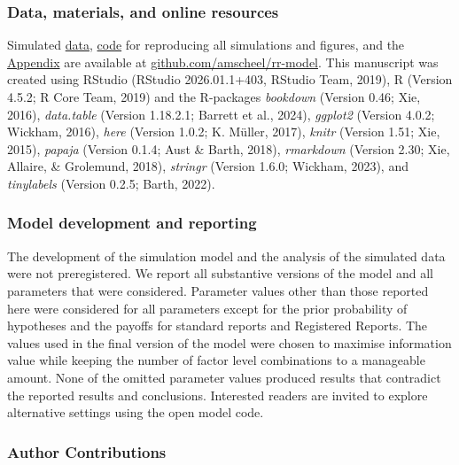 \documentclass[
  british,
  a4paper,
  ,man,floatsintext]{apa6}
\begin{document}
\subsubsection{Data, materials, and online resources}\label{data-materials-and-online-resources}

Simulated \href{https://github.com/amscheel/rr-model/tree/master/data}{data}, \href{https://github.com/amscheel/rr-model/tree/master/code}{code} for reproducing all simulations and figures, and the \href{https://github.com/amscheel/rr-model/blob/master/appendix/rr-risk-sensitivity_appendix.pdf}{Appendix} are available at \href{https://github.com/amscheel/rr-model}{github.com/amscheel/rr-model}.
This manuscript was created using RStudio (RStudio 2026.01.1+403, RStudio Team, 2019), R (Version 4.5.2; R Core Team, 2019) and the R-packages \emph{bookdown} (Version 0.46; Xie, 2016), \emph{data.table} (Version 1.18.2.1; Barrett et al., 2024), \emph{ggplot2} (Version 4.0.2; Wickham, 2016), \emph{here} (Version 1.0.2; K. Müller, 2017), \emph{knitr} (Version 1.51; Xie, 2015), \emph{papaja} (Version 0.1.4; Aust \& Barth, 2018), \emph{rmarkdown} (Version 2.30; Xie, Allaire, \& Grolemund, 2018), \emph{stringr} (Version 1.6.0; Wickham, 2023), and \emph{tinylabels} (Version 0.2.5; Barth, 2022).

\subsubsection{Model development and reporting}\label{model-development-and-reporting}

The development of the simulation model and the analysis of the simulated data were not preregistered.
We report all substantive versions of the model and all parameters that were considered.
Parameter values other than those reported here were considered for all parameters except for the prior probability of hypotheses and the payoffs for standard reports and Registered Reports.
The values used in the final version of the model were chosen to maximise information value while keeping the number of factor level combinations to a manageable amount.
None of the omitted parameter values produced results that contradict the reported results and conclusions.
Interested readers are invited to explore alternative settings using the open model code.

\subsubsection{Author Contributions}\label{author-contributions}
\end{document}
